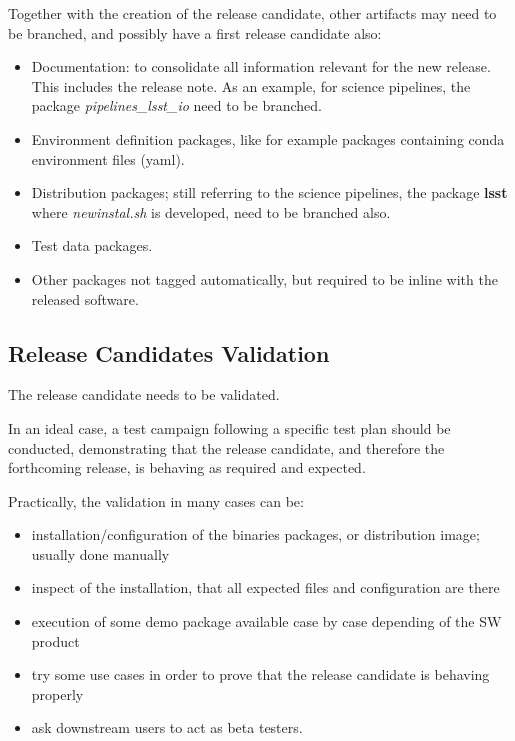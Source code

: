 Together with the creation of the release candidate, other artifacts may need to be branched, and possibly have a first release candidate also:

\begin{itemize}
\item Documentation: to consolidate all information relevant for the new release. This includes the release note. 
As an example, for science pipelines, the package \textit{pipelines\_lsst\_io} need to be branched.
\item  Environment definition packages, like for example packages containing conda environment files (yaml).
\item  Distribution packages; still referring to the science pipelines, the package \textbf{lsst}  where \textit{newinstal.sh} is developed, need to be branched also.
\item Test data packages.
\item Other packages not tagged automatically, but required to be inline with the released software.
\end{itemize}


\subsection{Release Candidates Validation} \label{sec:rcvalidation}

The release candidate needs to be validated.

In an ideal case, a test campaign following a specific test plan should be conducted, demonstrating that the release candidate, and therefore the forthcoming release, is behaving as required and expected.

Practically, the validation in many cases can be:

\begin{itemize}
\item installation/configuration of the binaries packages, or distribution image; usually done manually
\item inspect of the installation, that all expected files and configuration are there
\item execution of some demo package available case by case depending of the SW product
\item try some use cases in order to prove that the release candidate is behaving properly
\item ask downstream users to act as beta testers.
\end{itemize}

